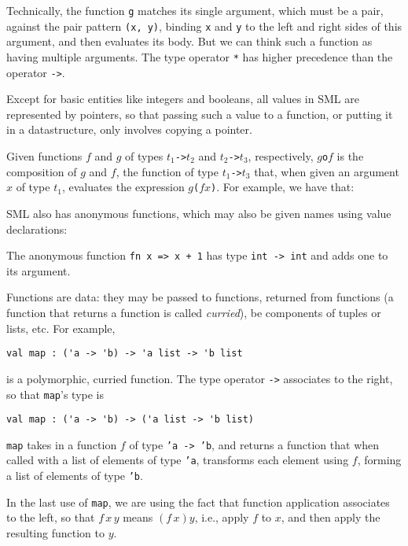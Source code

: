 Technically, the function \texttt{g} matches its single argument,
which must be a pair, against the pair pattern \texttt{(x,~y)},
binding \texttt{x} and \texttt{y} to the left and right sides of this
argument, and then evaluates its body.  But we can think such a
function as having multiple arguments.
%
The type operator \texttt{*} has higher precedence
than the operator \texttt{->}.

Except for basic entities like integers and booleans, all values in
SML are represented by pointers, so that passing such a value to a
function, or putting it in a datastructure, only involves copying a
pointer.

Given functions $f$ and $g$ of types \texttt{$t_1$\;->\;$t_2$} and
\texttt{$t_2$\;->\;$t_3$}, respectively, \texttt{$g$\;o\;$f$} is the
composition
%
%
of $g$ and $f$, the function of type
\texttt{$t_1$\;->\;$t_3$} that, when given an argument $x$ of type
$t_1$, evaluates the expression \texttt{$g$($f$\;$x$)}.
For example, we have that:


SML also has anonymous functions, which may also be given names
using value declarations:

The anonymous function \texttt{fn x => x + 1} has type
\texttt{int~->~int} and adds one to its argument.

Functions are data: they may be passed to functions, returned from
functions (a function that returns a function is called
\emph{curried}), be components of tuples or lists, etc.
For example,
\begin{verbatim}
val map : ('a -> 'b) -> 'a list -> 'b list
\end{verbatim}
is a polymorphic, curried function.  The type operator \texttt{->}
associates
%
to the right, so that \texttt{map}'s type is
\begin{verbatim}
val map : ('a -> 'b) -> ('a list -> 'b list)
\end{verbatim}
\texttt{map} takes in a function
$f$ of type \texttt{'a~->~'b}, and returns a function that when called
with a list of elements of type \texttt{'a}, transforms each element
using $f$, forming a list of elements of type \texttt{'b}.

In the last use of \texttt{map}, we are using the fact that
function application associates to the left, so that
%
$f\,x\,y$ means $(f\,x)y$, i.e., apply $f$ to $x$, and
then apply the resulting function to $y$.

